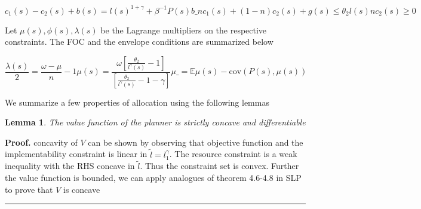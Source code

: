 \documentclass[thmsb,11pt]{article}
\newtheorem{lemma}{Lemma}
\newcommand{\cov}{\mathrm{cov}}
\newenvironment{proof}[1][Proof]{\noindent \textbf{#1.} }{\  \rule{0.5em}{0.5em}}
\begin{document}
   \begin{subequations}
   \label{sys-2 agent QL constraint}
   	\begin{equation}
   	\label{eq-implementability constraint}
   	c_1(s)-c_2(s)+b(s)=l(s)^{1+\gamma}+\beta^{-1} P(s)b\_
   	\end{equation}

 
\begin{equation}
	\label{eq-resoruces}
   	n c_1(s)+(1-n)c_2(s)+g(s)\leq\theta_2 l(s)n
\end{equation}   


\begin{equation}
	\label{eq-resoruces}
   	c_2(s)\geq0
\end{equation}   

   \end{subequations}

Let $\mu(s),\phi(s),\lambda(s)$ be the Lagrange multipliers on the respective constraints. The FOC and the envelope conditions are summarized below


\begin{subequations}
   \label{sys-FOC}
   	\begin{equation}
   	\label{eq-foc c_2}
   	\frac{\lambda(s)}{2}=\frac{\omega-\mu}{n}-1
   	\end{equation}
   	\begin{equation}
\label{eq-foc l_1}
   \mu(s)= \frac{\omega\left[\frac{\theta_2}{l^{\gamma}(s)}-1\right]	}{\left[\frac{\theta_2}{l^{\gamma}(s)}-1-\gamma\right]}
   	\end{equation}

   	\begin{equation}
\label{eq-foc b(s)}
   \mu\_=\mathbb{E}\mu(s)-\cov(P(s),\mu(s))
   	\end{equation}   	
 \end{subequations}

We summarize a few properties of allocation using the following lemmas

\begin{lemma}
The value function of the planner is strictly concave and differentiable
\end{lemma}
\begin{proof}
 concavity of $V$ can be shown by observing that objective
function and the implementability constraint is linear in $\tilde{l}%
=l_1^{\gamma}$. The resource constraint is a weak inequality with the RHS
concave in $\tilde{l}$. Thus the constraint set is convex. Further the value
function is bounded, we can apply analogues of theorem 4.6-4.8 in SLP to
prove that $V$ is concave
\end{proof}
\end{document}

